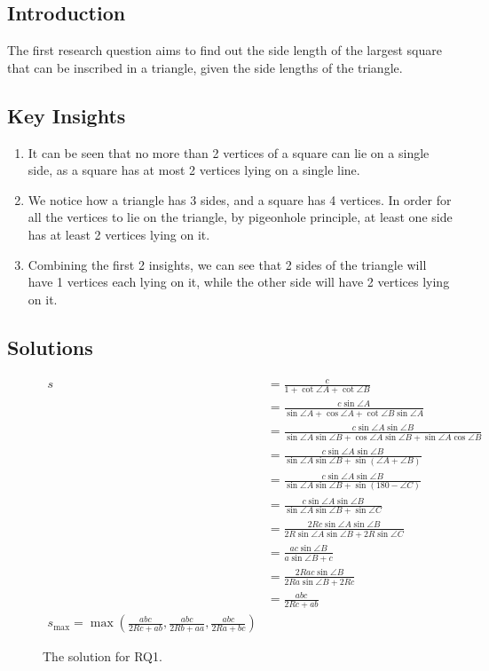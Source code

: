 \documentclass[12pt]{scrartcl}
\begin{document}
\subsection{Introduction}
The first research question aims to find out the side length of the largest square that can be inscribed in a triangle, given the side lengths of the triangle.

\subsection{Key Insights}
\begin{enumerate}
	\item It can be seen that no more than 2 vertices of a square can lie on a single side, as a square has at most 2 vertices lying on a single line.
	\item We notice how a triangle has 3 sides, and a square has 4 vertices. In order for all the vertices to lie on the triangle, by pigeonhole principle, at least one side has at least 2 vertices lying on it.
	\item Combining the first 2 insights, we can see that 2 sides of the triangle will have 1 vertices each lying on it, while the other side will have 2 vertices lying on it.
\end{enumerate}

\subsection{Solutions}
\begin{figure}[htpb]
\centering
\begin{align*}
s &= \frac{c}{1+\cot \angle A+\cot \angle B} \\
&=\frac{c\sin \angle A}{\sin \angle A+\cos \angle A+\cot \angle B\sin \angle A} \\
&=\frac{c\sin \angle A\sin \angle B}{\sin \angle A\sin \angle B+\cos \angle A\sin \angle B+\sin \angle A\cos \angle B} \\
&=\frac{c\sin \angle A\sin \angle B}{\sin \angle A\sin \angle B+\sin\left(\angle A+\angle B\right)} \\
&=\frac{c\sin \angle A\sin \angle B}{\sin \angle A\sin \angle B+\sin\left(180-\angle C\right)} \\
&=\frac{c\sin \angle A\sin \angle B}{\sin \angle A\sin \angle B+\sin \angle C} \\
&=\frac{2Rc\sin \angle A\sin \angle B}{2R\sin \angle A\sin \angle B+2R\sin \angle C} \\
&=\frac{ac\sin \angle B}{a\sin \angle B+c} \\
&=\frac{2Rac\sin \angle B}{2Ra\sin \angle B+2Rc} \\
&=\frac{abc}{2Rc+ab} \\
s_{\text{max}}=\max\left(\frac{abc}{2Rc+ab},\frac{abc}{2Rb+aa},\frac{abc}{2Ra+bc}\right)
\end{align*}
\caption{The solution for RQ1.}
\label{fig:rq1m}
\end{figure}

\printbibliography
\end{document}
